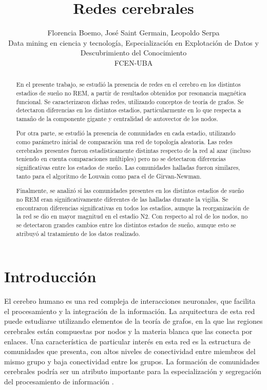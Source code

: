 \documentclass[a4paper,10pt,twocolumn,spanish]{article}
\title{Redes cerebrales}
\author{
    Florencia Boemo, 
    José Saint Germain,
    Leopoldo Serpa\\
	\footnotesize Data mining en ciencia y tecnología, Especialización en Explotación de Datos y Descubrimiento del Conocimiento\\  
 \footnotesize FCEN-UBA
}
\date{\empty} %
\begin{document}
\maketitle
\begin{abstract} 
En el presente trabajo, se estudió la presencia de redes en el cerebro en los distintos estadios de sueño no REM, a partir de resultados obtenidos por resonancia magnética funcional. Se caracterizaron dichas redes, utilizando conceptos de teoría de grafos. Se detectaron diferencias en los distintos estadios, particularmente en lo que respecta a tamaño de la componente gigante y centralidad de autovector de los nodos.

Por otra parte, se estudió la presencia de comunidades en cada estadio, utilizando como parámetro inicial de comparación una red de topología aleatoria. Las redes cerebrales presentes fueron estadísticamente distintas respecto de la red al azar (incluso teniendo en cuenta comparaciones múltiples) pero no se detectaron diferencias significativas entre los estados de sueño. Las comunidades halladas fueron similares, tanto para el algoritmo de Louvain como para el de Girvan-Newman.

Finalmente, se analizó si las comunidades presentes en los distintos estadios de sueño no REM eran significativamente diferentes de las halladas durante la vigilia. Se encontraron diferencias significativas en todos los estadios, aunque la reorganización de la red se dio en mayor magnitud en el estadio N2. Con respecto al rol de los nodos, no se detectaron grandes cambios entre los distintos estados de sueño, aunque esto se atribuyó al tratamiento de los datos realizado.

\end{abstract}
\section{Introducción}

El cerebro humano es una red compleja de interacciones neuronales, que facilita el procesamiento y la integración de la información. La arquitectura de esta red puede estudiarse utilizando elementos de la teoría de grafos, en la que las regiones cerebrales están compuestas por nodos y la materia  blanca que las conecta por enlaces. Una característica de particular interés en esta red es la estructura de comunidades que presenta, con altos niveles de conectividad entre miembros del mismo grupo y baja conectividad entre los grupos. La formación de comunidades cerebrales podría ser un atributo importante para la especialización y segregación del procesamiento de información \cite{ref1}.
\end{document}
